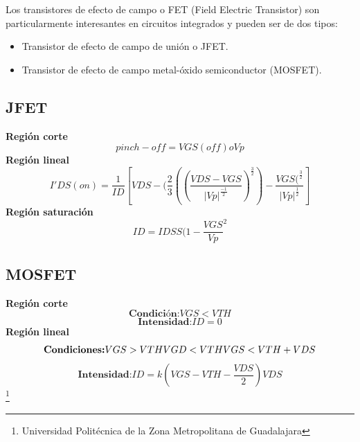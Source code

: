 \documentclass[10pt,a4paper]{article}
\begin{document}
Los transistores de efecto de campo o FET (Field Electric Transistor) son particularmente interesantes
en circuitos integrados y pueden ser de dos tipos:\\
\begin{itemize}
\item Transistor de efecto de campo de unión o JFET.
\item Transistor de efecto de campo metal-óxido semiconductor (MOSFET).
\end{itemize}

\subsection{JFET}
\textbf{Región corte}
\begin{equation}
pinch-off = VGS (off) o Vp
\end{equation}
\textbf{Región lineal}
\begin{equation}
I'DS(on) = \frac{1}{ID} [VDS - (\frac{2}{3}((\frac{VDS - VGS}{|Vp|^\frac{-1}{2}})^\frac{3}{2}) - \frac{VGS(^\frac{3}{2}}{|Vp|^\frac{1}{2}}]
\end{equation}
\textbf{Región saturación}
\begin{equation}
ID = IDSS (1 - \frac{VGS}{Vp}^2
\end{equation}

\subsection{MOSFET} 
\textbf{Región corte}
\begin{equation}
\textbf{Condición:} VGS<VTH
\end{equation}
\begin{equation}
\textbf{Intensidad:} ID = 0
\end{equation}
\textbf{Región lineal}
\begin{equation}
\textbf{Condiciones:} VGS>VTH\\
VGD<VTH VGS<VTH+VDS\\
\end{equation}
\begin{equation}
\textbf{Intensidad:} ID = k(VGS - VTH - \frac{VDS}{2})VDS
\end{equation}
\footnote{Universidad Politécnica de la Zona Metropolitana de Guadalajara}

\newpage
\end{document}
